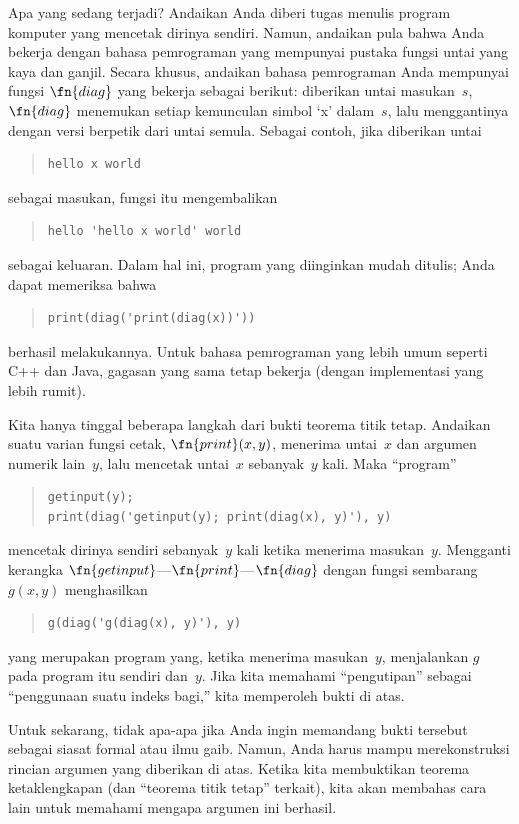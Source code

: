 \documentclass[../../../include/open-logic-section]{subfiles}
\begin{document}
\begin{explain}
Apa yang sedang terjadi? Andaikan Anda diberi tugas menulis program komputer
yang mencetak dirinya sendiri. Namun, andaikan pula bahwa Anda bekerja dengan
bahasa pemrograman yang mempunyai pustaka fungsi untai yang kaya dan ganjil.
Secara khusus, andaikan bahasa pemrograman Anda mempunyai fungsi $\fn{diag}$
yang bekerja sebagai berikut: diberikan untai masukan~$s$, $\fn{diag}$
menemukan setiap kemunculan simbol `x' dalam~$s$, lalu menggantinya dengan
versi berpetik dari untai semula. Sebagai contoh, jika diberikan untai
\begin{quote}
\begin{verbatim}
hello x world
\end{verbatim}
\end{quote}
sebagai masukan, fungsi itu mengembalikan
\begin{quote}
\begin{verbatim}
hello 'hello x world' world
\end{verbatim}
\end{quote}
sebagai keluaran. Dalam hal ini, program yang diinginkan mudah ditulis; Anda
dapat memeriksa bahwa
\begin{quote}
\begin{verbatim}
print(diag('print(diag(x))'))
\end{verbatim}
\end{quote}
berhasil melakukannya. Untuk bahasa pemrograman yang lebih umum seperti C++
dan Java, gagasan yang sama tetap bekerja (dengan implementasi yang lebih
rumit).

Kita hanya tinggal beberapa langkah dari bukti teorema titik tetap. Andaikan
suatu varian fungsi cetak, $\fn{print}(x,y)$, menerima untai~$x$ dan argumen
numerik lain~$y$, lalu mencetak untai~$x$ sebanyak~$y$ kali.
Maka ``program''
\begin{quote}
\begin{verbatim}
getinput(y);
print(diag('getinput(y); print(diag(x), y)'), y)
\end{verbatim}
\end{quote}
mencetak dirinya sendiri sebanyak~$y$ kali ketika menerima masukan~$y$.
Mengganti kerangka $\fn{getinput}$---$\fn{print}$---$\fn{diag}$ dengan fungsi
sembarang $g(x,y)$ menghasilkan
\begin{quote}
\begin{verbatim}
g(diag('g(diag(x), y)'), y)
\end{verbatim}
\end{quote}
yang merupakan program yang, ketika menerima masukan~$y$, menjalankan $g$ pada
program itu sendiri dan~$y$. Jika kita memahami ``pengutipan'' sebagai
``penggunaan suatu indeks bagi,'' kita memperoleh bukti di atas.

Untuk sekarang, tidak apa-apa jika Anda ingin memandang bukti tersebut
sebagai siasat formal atau ilmu gaib. Namun, Anda harus mampu merekonstruksi
rincian argumen yang diberikan di atas. Ketika kita membuktikan teorema
ketaklengkapan (dan ``teorema titik tetap'' terkait), kita akan membahas
cara lain untuk memahami mengapa argumen ini berhasil.
\end{explain}
\end{document}
